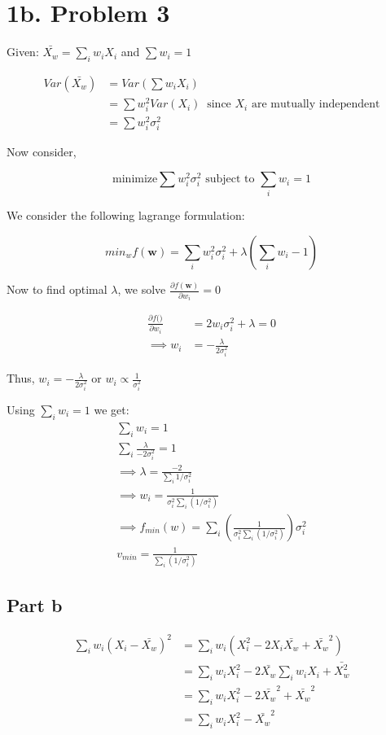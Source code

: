 \documentclass[a4paper]{article}
\begin{document}
\section*{1b. Problem 3}

Given: $\bar{X_w} = \sum_i w_i X_i $ and $\sum w_i =1 $

\begin{align*}
Var(\bar{X_w}) &= Var(\sum w_i X_i)\\
&= \sum w_i^2Var(X_i)\ \text{ since $X_i$ are mutually independent}\\
&= \sum w_i^2 \sigma_i^2
\end{align*}

Now consider,

$$
\text{minimize} \sum w_i^2\sigma_i^2 \text{ subject to } \sum_i w_i =1
$$

We consider the following lagrange formulation:

$$min_w f(\mathbf{w}) = \sum_i w_i^2\sigma_i^2 +\lambda(\sum_iw_i-1)$$

Now to find optimal $\lambda$, we solve $\frac{\partial f(\mathbf{w})}{\partial w_i} = 0$

\begin{align*}
\frac{\partial f(\mathbf)}{\partial w_i} &= 2w_i\sigma_i^2+\lambda =0\\
\implies w_i &= -\frac{\lambda}{2\sigma_i^2}
\end{align*}

Thus, $w_i = -\frac{\lambda}{2\sigma_i^2}$ or $w_i \propto \frac{1}{\sigma_i^2}$

Using $\sum_i w_i=1$  we get:
\begin{eqnarray*}
\sum_i w_i = 1\\
\sum_i \frac{\lambda}{-2\sigma_i^2} =1\\
\implies \lambda = \frac{-2}{\sum_i 1/\sigma_i^2 }\\
\implies w_i = \frac{1}{\sigma_i^2 \sum_i(1/\sigma_i^2)}\\
\implies f_{min}(w) = \sum_i (\frac{1}{\sigma_i^2 \sum_i(1/\sigma_i^2)}) \sigma_i^2\\
v_{min} = \frac{1}{\sum_i(1/\sigma_i^2)}
\end{eqnarray*}


\subsection*{Part b}

\begin{align*}
\sum_i w_i (X_i-\bar{X_w})^2 &= \sum_i w_i(X_i^2-2X_i\bar{X_w}+\bar{X_w}^2)\\
&= \sum_i w_iX_i^2-2\bar{X_w}\sum_iw_iX_i+\bar{X_w^2}\\
&= \sum_i w_iX_i^2 -2\bar{X_w}^2+\bar{X_w}^2\\
&= \sum_i w_iX_i^2 -\bar{X_w}^2
\end{align*}
\end{document}
